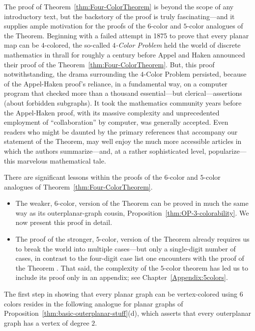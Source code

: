 The proof of Theorem~\ref{thm:Four-ColorTheorem} is beyond the scope
of any introductory text, but the backstory of the proof is truly fascinating---and it 
supplies ample motivation for the proofs of the $6$-color and $5$-color analogues
of the Theorem.  Beginning with a failed attempt in 1875 to prove that every planar
map can be $4$-colored, the so-called {\it $4$-Color Problem} held the world of discrete 
mathematics in thrall for roughly a century before Appel and Haken announced their proof of the Theorem~\ref{thm:Four-ColorTheorem}.  But, this proof notwithstanding,
the drama surrounding the $4$-Color Problem persisted,
because of the Appel-Haken proof's reliance, in a fundamental way, on
a computer program that checked more than a thousand essential---but
clerical---assertions (about forbidden subgraphs).  It took the
mathematics community years before the Appel-Haken proof, with its massive
complexity and unprecedented employment of ``collaboration'' by
computer, was generally accepted.  Even readers who might be daunted by the primary
references \cite{AppelH77a,AppelH77b} that accompany our statement of
the Theorem, may well enjoy the much more accessible articles \cite{AppelH77c,AppelH89}
in which the authors summarize---and, at a rather
sophisticated level, popularize---this marvelous mathematical tale.

\medskip

There are significant lessons within the proofs of the $6$-color and $5$-color
analogues of Theorem~\ref{thm:Four-ColorTheorem}.
\begin{itemize}
\item
The weaker, $6$-color, version of the Theorem can be proved in much the same way as its
outerplanar-graph cousin, Proposition~\ref{thm:OP-3-colorability}.  We now present this proof in detail.  
\item
The proof of the stronger, $5$-color, version of the Theorem already requires us to break the
world into multiple cases---but only a single-digit number of cases, in contrast to the four-digit
case list one encounters with the proof of the Theorem \cite{AppelH77a,AppelH77b}.  That said,
the complexity of the $5$-color theorem has led us to include its proof only in an appendix; see
Chapter~\ref{Appendix:5colors}.
\end{itemize}

\bigskip

The first step in showing that every planar graph can be vertex-colored using
$6$ colors resides in the following analogue for planar graphs of
Proposition~\ref{thm:basic-outerplanar-stuff}(d), which asserts that
every outerplanar graph has a vertex of degree $2$.


